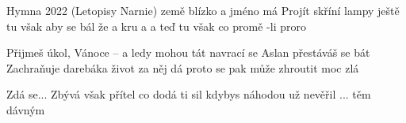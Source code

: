 \begin{TEXT}{Hymna 2022 (Letopisy Narnie)}
\SLOKA {} země   blízko \NL
{} a   jméno má\NL
Projít skříní  lampy  ještě \NL  
{} tu však   aby se bál\NL
\SLOKA[Ref.1:]	 že  a  kru\NL
a  a  teď  tu \NL
{} však  co  promě\NL
{}-li  proro\NL


\SLOKA Přijmeš úkol, Vánoce – a ledy mohou tát\NL
navrací se Aslan přestáváš se bát\NL
Zachraňuje darebáka život za něj dá\NL
proto se pak může zhroutit moc zlá\NL

\SLOKA[Ref.2:] Zdá se...\NL
Zbývá však přítel co dodá ti sil\NL
kdybys náhodou už nevěřil\NL
... těm dávným \NL  	

\end{TEXT}